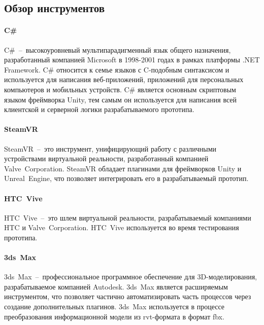 ﻿\subsection{Обзор инструментов}
\label{subsections:Tools}


\paragraph{C\#}
C\#~--~высокоуровневый мультипарадигменный язык общего назначения,
разработанный компанией Microsoft в 1998-2001 годах
в рамках платформы .NET Framework.
C\# относится к семье языков с C-подобным синтаксисом и
используется для написания веб-приложений,
приложений для персональных компьютеров и мобильных устройств.
\cite{DocCSharp}
C\# является основным скриптовым языком фреймворка Unity,
тем самым он используется для написания всей
клиентской и серверной логики разрабатываемого прототипа.

\paragraph{SteamVR}
SteamVR~--~это инструмент, унифицирующий работу с различными
устройствами виртуальной реальности,
разработанный компанией Valve~Corporation.%
\cite{SteamVR}
SteamVR обладает плагинами для фреймворков Unity и Unreal~Engine,
что позволяет интегрировать его в разрабатываемый прототип. 

\paragraph{HTC~Vive}

HTC~Vive~--~это шлем виртуальной реальности,
разрабатываемый компаниями HTC и Valve~Corporation.%
\cite{HTCVive}
HTC~Vive используется во время тестирования прототипа.

\paragraph{3ds~Max}

3ds~Max~--~профессиональное программное обеспечение для 3D-моделирования,
разрабатываемое компанией Autodesk.
3ds~Max является расширяемым инструментом,
что позволяет частично автоматизировать часть процессов
через создание дополнительных плагинов.%
\cite{Doc3DSMAX}
3ds~Max используется в процессе преобразования информационной модели
из rvt-формата в формат fbx.
